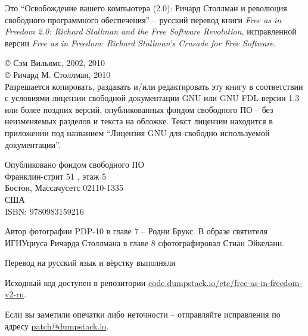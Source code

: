 \thispagestyle{plain}

\noindent Это \enquote{Освобождение вашего компьютера (2.0): Ричард Столлман и революция свободного программного обеспечения} -- русский перевод книги \textit{Free as in Freedom 2.0: Richard Stallman and the Free Software Revolution}, исправленной версии \textit{Free as in Freedom: Richard Stallman's Crusade for Free Software}.

\bigskip

\noindent \copyright{} Сэм Вильямс, 2002, 2010\\
\copyright{} Ричард М. Столлман, 2010\\

Разрешается копировать, раздавать и/или редактировать эту книгу в соответствии с условиями лицензии свободной документации GNU или GNU FDL версии 1.3 или более поздних версий, опубликованных фондом свободного ПО -- без неизменяемых разделов и текста на обложке. Текст лицензии находится в приложении под названием \enquote{Лицензия GNU для свободно используемой документации}.

\bigskip

\noindent Опубликовано фондом свободного ПО\\
Франклин-стрит 51 , этаж 5\\
Бостон, Массачусетс 02110-1335\\
США\\
ISBN: 9780983159216\\

\bigskip

\noindent Автор фотографии PDP-10 в главе 7 -- Родни Брукс. В образе святителя ИГНУциуса Ричарда Столлмана в главе 8 сфотографировал Стиан Эйкеланн.

\bigskip

Перевод на русский язык и вёрстку выполняли 

Исходный код доступен в репозитории
\href{https://code.dumpstack.io/etc/free-as-in-freedom-v2-ru}{code.dumpstack.io/etc/free-as-in-freedom-v2-ru}.

Если вы заметили опечатки либо неточности -- отправляйте исправления по адресу
\href{mailto:patch@dumpstack.io}{patch@dumpstack.io}.

\theendnotes
\setcounter{endnote}{0}
